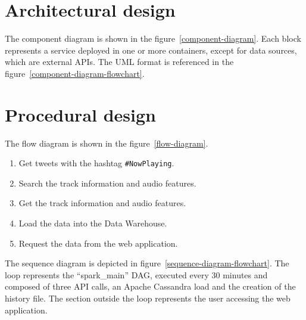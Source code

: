 \section{Architectural design}
\nonzeroparskip The component diagram is shown in the figure~\ref{component-diagram}. Each block represents a service deployed in one or more containers, except for data sources, which are external APIs. The UML format is referenced in the figure~\ref{component-diagram-flowchart}.



\section{Procedural design}
\nonzeroparskip The flow diagram is shown in the figure~\ref{flow-diagram}.
\begin{enumerate}
	\item Get tweets with the hashtag \texttt{\#NowPlaying}.
	\item Search the track information and audio features.
	\item Get the track information and audio features.
	\item Load the data into the Data Warehouse.
	\item Request the data from the web application.
\end{enumerate}


\nonzeroparskip The sequence diagram is depicted in figure~\ref{sequence-diagram-flowchart}. The loop represents the ``spark\_main'' DAG, executed every 30 minutes and composed of three API calls, an Apache Cassandra load and the creation of the history file. The section outside the loop represents the user accessing the web application.

